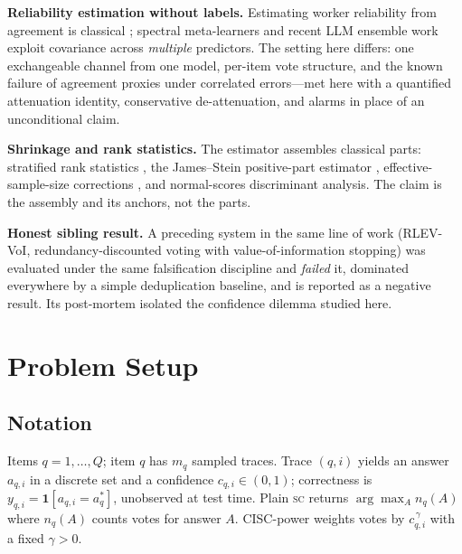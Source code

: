 \documentclass{article}
\newcommand{\SC}{\textsc{sc}}
\begin{document}
\textbf{Reliability estimation without labels.} Estimating worker reliability from agreement is classical \citep{dawid1979maximum,whitehill2009whose,karger2011iterative}; spectral meta-learners \citep{parisi2014ranking} and recent LLM ensemble work \citep{fuse2026,beyondmajority2025} exploit covariance across \emph{multiple} predictors. The setting here differs: one exchangeable channel from one model, per-item vote structure, and the known failure of agreement proxies under correlated errors---met here with a quantified attenuation identity, conservative de-attenuation, and alarms in place of an unconditional claim.

\textbf{Shrinkage and rank statistics.} The estimator assembles classical parts: stratified rank statistics \citep{vanelteren1960}, the James--Stein positive-part estimator \citep{james1961estimation}, effective-sample-size corrections \citep{kish1965,rao1981analysis}, and normal-scores discriminant analysis. The claim is the assembly and its anchors, not the parts.

\textbf{Honest sibling result.} A preceding system in the same line of work
(RLEV-VoI, redundancy-discounted voting with value-of-information stopping)
was evaluated under the same falsification discipline and \emph{failed} it,
dominated everywhere by a simple deduplication baseline, and is reported as a
negative result. Its post-mortem isolated the confidence dilemma studied
here.%


\section{Problem Setup}\label{sec:setup}

\subsection{Notation}
Items $q=1,\dots,Q$; item $q$ has $m_q$ sampled traces. Trace $(q,i)$ yields an answer $a_{q,i}$ in a discrete set and a confidence $c_{q,i}\in(0,1)$; correctness is $y_{q,i}=\mathbf{1}[a_{q,i}=a_q^\ast]$, unobserved at test time. Plain \SC{} returns $\arg\max_A n_q(A)$ where $n_q(A)$ counts votes for answer $A$. CISC-power weights votes by $c_{q,i}^{\,\gamma}$ with a fixed $\gamma>0$.
\end{document}
